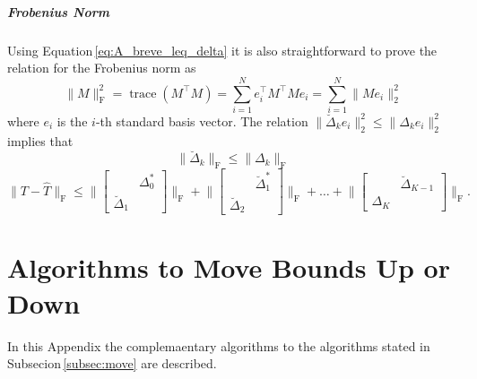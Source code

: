 \documentclass[doctype=mastersthesis,BCOR=15mm,biblatex]{ldvbook}%
\DeclareMathOperator{\trace}{trace}
\begin{document}
\paragraph{Frobenius Norm}
Using Equation\,\ref{eq:A_breve_leq_delta} it is also straightforward to prove the relation for the Frobenius norm
as 
\begin{equation}
	\|M\|_\text{F}^2 = \trace(M^\top M) = \sum_{i=1}^{N} e_i^\top M^\top M e_i = \sum_{i=1}^{N} \|M e_i\|_2^2
\end{equation}
where $e_i$ is the $i$-th standard basis vector.
The relation $\|\breve{\Delta}_k e_i\|_2^2 \leq \|\Delta_k e_i\|_2^2$ implies that 
\begin{equation}
	\|\breve{\Delta}_k\|_\text{F} \leq \|\Delta_k\|_\text{F}
\end{equation}
\begin{equation}
\|T-\hat{T}\|_\text{F} \leq
\Bigg\|
\begin{bmatrix}
&\Delta_0^*\\
\breve{\Delta}_1
\end{bmatrix}
\Bigg\|_\text{F}+\Bigg\|
\begin{bmatrix}
&\breve{\Delta}_1^*\\
\breve{\Delta}_2
\end{bmatrix}
\Bigg\|_\text{F}+\dots+\Bigg\|
\begin{bmatrix}
&\breve{\Delta}_{K-1}\\
\Delta_K
\end{bmatrix}
\Bigg\|_\text{F}.
\end{equation}

\chapter{Algorithms to Move Bounds Up or Down}\label{A:move}
In this Appendix the complemaentary algorithms to the algorithms stated in Subsecion\,\ref{subsec:move} are described.
\end{document}
